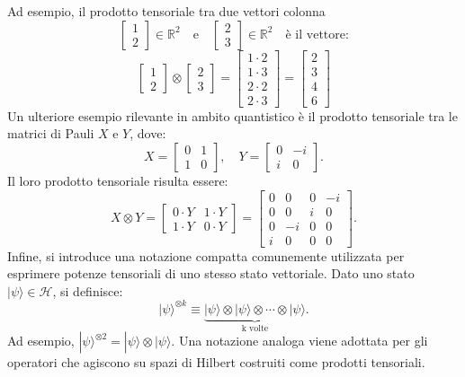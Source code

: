 \documentclass[a4paper,12pt]{report}
\theoremstyle{plain}
\begin{document}
Ad esempio, il prodotto tensoriale tra due vettori colonna
\[
\begin{bmatrix}
1 \\
2
\end{bmatrix} \in \mathbb{R}^2 \quad \text{e} \quad \begin{bmatrix}
2 \\
3
\end{bmatrix} \in \mathbb{R}^2 \quad \text{è il vettore:}
\]
\[
\begin{bmatrix}
1 \\
2
\end{bmatrix} \otimes \begin{bmatrix}
2 \\
3
\end{bmatrix} =
\begin{bmatrix}
1 \cdot 2 \\
1 \cdot 3 \\
2 \cdot 2 \\
2 \cdot 3
\end{bmatrix}
= \begin{bmatrix}
2 \\
3 \\
4 \\
6
\end{bmatrix}
\]
Un ulteriore esempio rilevante in ambito quantistico è il prodotto tensoriale tra le matrici di Pauli \( X \) e \( Y \), dove:
\[
X = \begin{bmatrix} 0 & 1 \\ 1 & 0 \end{bmatrix}, \quad Y = \begin{bmatrix} 0 & -i \\ i & 0 \end{bmatrix}.
\]
Il loro prodotto tensoriale risulta essere:
\[
X \otimes Y = \begin{bmatrix} 0 \cdot Y & 1 \cdot Y \\ 1 \cdot Y & 0 \cdot Y \end{bmatrix} = \begin{bmatrix} 
0 & 0 & 0 & -i \\ 
0 & 0 & i & 0 \\ 
0 & -i & 0 & 0 \\ 
i & 0 & 0 & 0 
\end{bmatrix}.
\]
Infine, si introduce una notazione compatta comunemente utilizzata per esprimere potenze tensoriali di uno stesso stato vettoriale. Dato uno stato \( |\psi\rangle \in \mathcal{H} \), si definisce:
\[
|\psi\rangle^{\otimes k} \equiv \underbrace{|\psi\rangle \otimes |\psi\rangle \otimes \cdots \otimes |\psi\rangle}_{\text{k volte}}.
\]
Ad esempio, \( |\psi\rangle^{\otimes 2} = |\psi\rangle \otimes |\psi\rangle \). Una notazione analoga viene adottata per gli operatori che agiscono su spazi di Hilbert costruiti come prodotti tensoriali.
\end{document}
